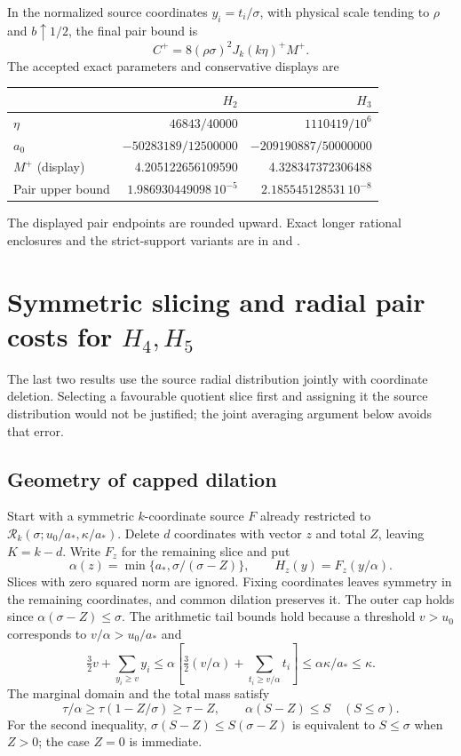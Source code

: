 \documentclass[11pt,a4paper]{article}
\theoremstyle{definition}\newtheorem{definition}[theorem]{Definition}
\theoremstyle{remark}\newtheorem{remark}[theorem]{Remark}
\newcommand{\smalltable}{\small\setlength{\tabcolsep}{5pt}}
\numberwithin{equation}{section}
\begin{document}
In the normalized source coordinates $y_i=t_i/\sigma$, with physical scale tending to $\rho$ and $b\uparrow1/2$, the final pair bound is
\[
 C^+=8(\rho\sigma)^2J_k(k\eta)^+M^+.
\]
The accepted exact parameters and conservative displays are
\begin{center}\smalltable
\begin{tabular}{@{}lrr@{}}\toprule
&$H_2$&$H_3$\\\midrule
$\eta$&$46843/40000$&$1110419/10^6$\\
$a_0$&$-50283189/12500000$&$-209190887/50000000$\\
$M^+$ (display)&4.205122656109590&4.328347372306488\\
Pair upper bound&$1.986930449098\,10^{-5}$&$2.185545128531\,10^{-8}$\\\bottomrule
\end{tabular}\end{center}
The displayed pair endpoints are rounded upward. Exact longer rational enclosures and the strict-support variants are in  and .

\section{Symmetric slicing and radial pair costs for \texorpdfstring{$H_4,H_5$}{H4,H5}}\label{sec:slicing}
The last two results use the source radial distribution jointly with coordinate deletion. Selecting a favourable quotient slice first and assigning it the source distribution would not be justified; the joint averaging argument below avoids that error.

\subsection{Geometry of capped dilation}
Start with a symmetric $k$-coordinate source $F$ already restricted to
$\mathcal R_k(\sigma;u_0/a_*,\kappa/a_*)$. Delete $d$ coordinates with vector $z$ and total $Z$, leaving $K=k-d$. Write $F_z$ for the remaining slice and put
\[
 \alpha(z)=\min\{a_*,\sigma/(\sigma-Z)\},\qquad H_z(y)=F_z(y/\alpha).
\]
Slices with zero squared norm are ignored. Fixing coordinates leaves symmetry in the remaining coordinates, and common dilation preserves it. The outer cap holds since $\alpha(\sigma-Z)\le\sigma$. The arithmetic tail bounds hold because a threshold $v>u_0$ corresponds to $v/\alpha>u_0/a_*$ and
\[
 \tfrac32v+\sum_{y_i\ge v}y_i
 \le\alpha\left[\tfrac32(v/\alpha)+\sum_{t_i\ge v/\alpha}t_i\right]
 \le\alpha\kappa/a_*\le\kappa.
\]
The marginal domain and the total mass satisfy
\begin{equation}\label{eq:dilation}
 \tau/\alpha\ge\tau(1-Z/\sigma)\ge\tau-Z,
 \qquad \alpha(S-Z)\le S\quad(S\le\sigma).
\end{equation}
For the second inequality, $\sigma(S-Z)\le S(\sigma-Z)$ is equivalent to $S\le\sigma$ when $Z>0$; the case $Z=0$ is immediate.
\end{document}
